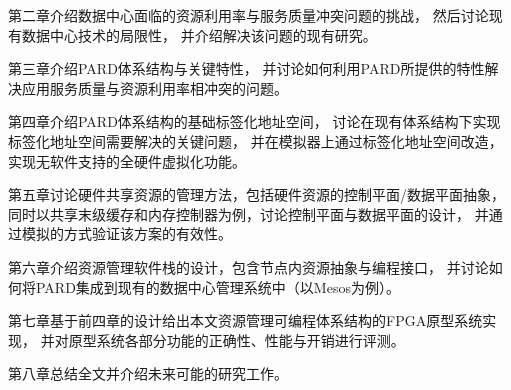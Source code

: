 第二章介绍数据中心面临的资源利用率与服务质量冲突问题的挑战，
然后讨论现有数据中心技术的局限性，
并介绍解决该问题的现有研究。

第三章介绍PARD体系结构与关键特性，
并讨论如何利用PARD所提供的特性解决应用服务质量与资源利用率相冲突的问题。

第四章介绍PARD体系结构的基础标签化地址空间，
讨论在现有体系结构下实现标签化地址空间需要解决的关键问题，
并在模拟器上通过标签化地址空间改造，实现无软件支持的全硬件虚拟化功能。

第五章讨论硬件共享资源的管理方法，包括硬件资源的控制平面/数据平面抽象，
同时以共享末级缓存和内存控制器为例，讨论控制平面与数据平面的设计，
并通过模拟的方式验证该方案的有效性。

第六章介绍资源管理软件栈的设计，包含节点内资源抽象与编程接口，
并讨论如何将PARD集成到现有的数据中心管理系统中（以Mesos\cite{Hindman:2011:Mesos}为例）。

第七章基于前四章的设计给出本文资源管理可编程体系结构的FPGA原型系统实现，
并对原型系统各部分功能的正确性、性能与开销进行评测。

第八章总结全文并介绍未来可能的研究工作。

